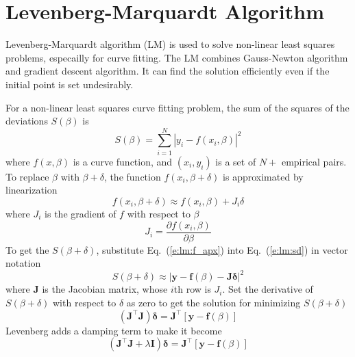 \documentclass{turgon}
\begin{document}
\chapter{Levenberg-Marquardt Algorithm}


Levenberg-Marquardt algorithm (LM) is used to solve non-linear least
squares problems, especailly for curve fitting. The LM combines
Gauss-Newton algorithm and gradient descent algorithm. It can find the
solution efficiently even if the initial point is set undesirably.

For a non-linear least squares curve fitting problem, the sum of the
squares of the deviations $S(\beta)$ is
\begin{equation}
    \label{e:lm:sd}
    S(\beta) = \sum_{i=1}^N \left| y_i - f(x_i, \beta) \right|^2
\end{equation}
where $f(x, \beta)$ is a curve function, and $(x_i, y_i)$ is a set of $N+$
empirical pairs. To replace $\beta$ with $\beta + \delta$, the function
$f(x_i, \beta + \delta)$ is approximated by linearization
\begin{equation}
    f(x_i, \beta + \delta) \approx f(x_i, \beta) + J_i \delta
    \label{e:lm:f_apx}
\end{equation}
where $J_i$ is the gradient of $f$ with respect to $\beta$
\begin{equation*}
    J_i = \frac{\partial f(x_i, \beta)}{\partial \beta}
\end{equation*}
To get the $S(\beta + \delta)$, substitute Eq.~(\ref{e:lm:f_apx}) into
Eq.~(\ref{e:lm:sd}) in vector notation
\begin{equation*}
    S(\beta + \delta) \approx
    \left| \mathbf{y} - \mathbf{f}(\beta) - \mathbf{J} \mathbf{\delta} \right|^2
\end{equation*}
where $\mathbf{J}$ is the Jacobian matrix, whose $i$th row is $J_i$. Set
the derivative of $S(\beta + \delta)$ with respect to $\delta$ as zero to
get the solution for minimizing $S(\beta + \delta)$
\begin{equation*}
    \left( \mathbf{J}^\top \mathbf{J} \right) \mathbf{\delta} =
    \mathbf{J}^\top \left[ \mathbf{y} - \mathbf{f}(\beta) \right]
\end{equation*}
Levenberg adds a damping term to make it become
\begin{equation*}
    \left( \mathbf{J}^\top \mathbf{J} + \lambda \mathbf{I} \right)
    \mathbf{\delta} =
    \mathbf{J}^\top \left[ \mathbf{y} - \mathbf{f}(\beta) \right]
\end{equation*}
\end{document}
